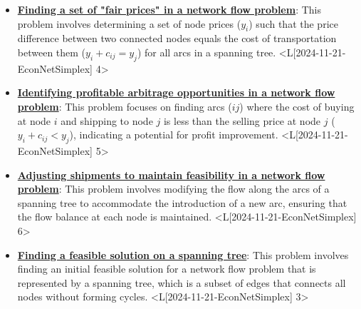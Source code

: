 \documentclass{article}%
\begin{document}
\begin{itemize}[[leftmargin=*]]%
\item \href{https://www.math.purdue.edu/~yipn/421/2024-11-21-EconNetSimplex.pdf#page=4}{\textbf{Finding a set of "fair prices" in a network flow problem}}: This problem involves determining a set of node prices ($y_i$) such that the price difference between two connected nodes equals the cost of transportation between them ($y_i + c_{ij} = y_j$) for all arcs in a spanning tree. <L[2024-11-21-EconNetSimplex] 4>%
\item \href{https://www.math.purdue.edu/~yipn/421/2024-11-21-EconNetSimplex.pdf#page=5}{\textbf{Identifying profitable arbitrage opportunities in a network flow problem}}: This problem focuses on finding arcs ($ij$) where the cost of buying at node $i$ and shipping to node $j$ is less than the selling price at node $j$ ($y_i + c_{ij} < y_j$), indicating a potential for profit improvement. <L[2024-11-21-EconNetSimplex] 5>%
\item \href{https://www.math.purdue.edu/~yipn/421/2024-11-21-EconNetSimplex.pdf#page=6}{\textbf{Adjusting shipments to maintain feasibility in a network flow problem}}: This problem involves modifying the flow along the arcs of a spanning tree to accommodate the introduction of a new arc, ensuring that the flow balance at each node is maintained. <L[2024-11-21-EconNetSimplex] 6>%
\item \href{https://www.math.purdue.edu/~yipn/421/2024-11-21-EconNetSimplex.pdf#page=3}{\textbf{Finding a feasible solution on a spanning tree}}: This problem involves finding an initial feasible solution for a network flow problem that is represented by a spanning tree, which is a subset of edges that connects all nodes without forming cycles. <L[2024-11-21-EconNetSimplex] 3>%
\end{itemize}%
\end{document}

